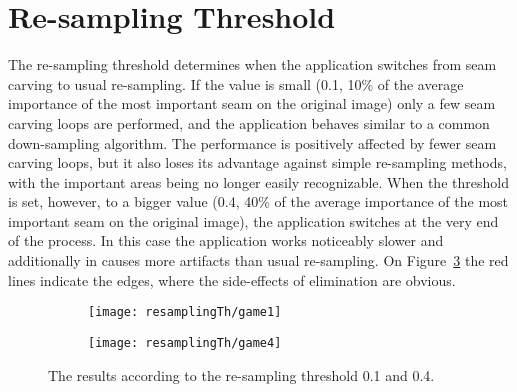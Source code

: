 \documentclass[draft,final]{vutinfth} %
\begin{document}
	\section{Re-sampling Threshold}
	\label{res:resampling}
	The re-sampling threshold determines when the application switches from seam carving to usual re-sampling. 
	If the value is small (0.1, 10\% of the average importance of the most important seam on the original image) only a few seam carving loops are performed, and the application behaves similar to a common down-sampling algorithm.
	The performance is positively affected by fewer seam carving loops, but it also loses its advantage against simple re-sampling methods, with the important areas being no longer easily recognizable.
	When the threshold is set, however, to a bigger value (0.4, 40\% of the average importance of the most important seam on the original image), the application switches at the very end of the process.
	In this case the application works noticeably slower and additionally in causes more artifacts than usual re-sampling.
	On Figure~\ref{fig:res} the red lines indicate the edges, where the side-effects of elimination are obvious.
	\begin{figure}[H]
		\centering
		\begin{subfigure}[b]{0.45\columnwidth}
			\centering
			\texttt{[image: resamplingTh/game1]}
			\label{fig:res:th1}
		\end{subfigure}
		\begin{subfigure}[b]{0.45\columnwidth}
			\centering
			\texttt{[image: resamplingTh/game4]}
			\label{fig:res:th2}
		\end{subfigure}
		\caption{The results according to the re-sampling threshold 0.1 and 0.4.}
		\label{fig:res}
	\end{figure}  
\end{document}
